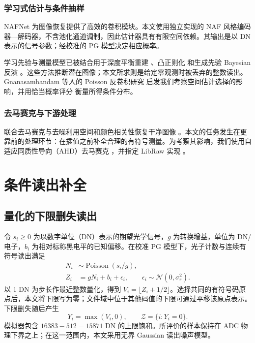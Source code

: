 \documentclass[10pt,twocolumn,journal]{IEEEtran}
\begin{document}
\subsubsection{学习式估计与条件抽样}
NAFNet \cite{nafnet} 为图像恢复提供了高效的卷积模块。本文使用独立实现的 NAF 风格编码器—解码器，不含池化通道调制，因此估计器具有有限空间依赖。其输出是以 DN 表示的信号参数；经校准的 PG 模型决定相应概率。

学习先验与测量模型已被结合用于深度平衡重建 \cite{gilton2021}、凸正则化 \cite{goujon2023} 和生成先验 Bayesian 反演 \cite{bohra2022}。这些方法推断潜在图像；本文所求则是给定零观测时被丢弃的整数读出。Gnanasambandam 等人的 Poisson 反卷积研究 \cite{gnanasambandam2024} 启发我们考察空间估计选择的影响，并用恰当概率评分 \cite{gneiting2007} 衡量所得条件分布。

\subsubsection{去马赛克与下游处理}
联合去马赛克与去噪利用空间和颜色相关性恢复干净图像 \cite{gharbi2016}。本文的任务发生在更靠前的处理环节：在插值之前补全合理的有符号测量。为考察其影响，我们使用自适应同质性导向（AHD）去马赛克 \cite{hirakawa2005}，并指定 LibRaw 实现 \cite{libraw}。

\section{条件读出补全}
\subsection{量化的下限删失读出}
令 $s_i\geq0$ 为以数字单位（DN）表示的期望光学信号，$g$ 为转换增益，单位为 DN/电子，$b_i$ 为相对标称黑电平的已知偏移。在校准 PG 模型下，光子计数与连续有符号读出满足
\begin{align}
N_i&\sim\operatorname{Poisson}(s_i/g),\label{eq:pois}\\
Z_i&=gN_i+b_i+\epsilon_i,\qquad \epsilon_i\sim\mathcal N(0,\sigma_r^2).\label{eq:forward}
\end{align}
以 1 DN 为步长作最近整数量化，得到 $V_i=\lfloor Z_i+1/2\rfloor$。选择共同的有符号码原点后，本文将下限写为零；文件域中位于其他码值的下限可通过平移该原点表示。下限删失随后产生
\begin{equation}
Y_i=\max(V_i,0),\qquad \mathcal Z=\{i:Y_i=0\}.\label{eq:censor}
\end{equation}
模拟器包含 $16383-512=15871$ DN 的上限饱和。所评价的样本保持在 ADC 物理下界之上；在这一范围内，本文采用无界 Gaussian 读出噪声模型。
\end{document}
